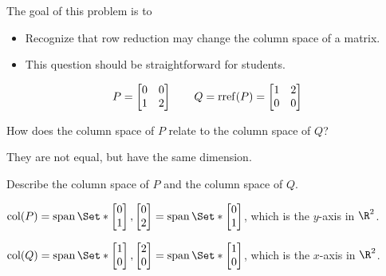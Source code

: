 \documentclass{problemset}
\newcommand{\bookonlynewpage}{\begin{bookonly}\newpage\end{bookonly}}
\begin{document}
	\bookonlynewpage
	\question
	\begin{annotation}
		\begin{goals}

			The goal of this problem is to
			\begin{itemize}
				\item Recognize that row reduction may change the column space of a matrix.
			\end{itemize}
		\end{goals}

		\begin{notes}
			\begin{itemize}
				\item This question should be straightforward for students.
			\end{itemize}
		\end{notes}
	\end{annotation}
	\[
		P=\mat{0&0\\1&2}\qquad Q=\rref(P)=\mat{1&2\\0&0}
	\]
	\begin{parts}
		\item How does the column space of $P$ relate to the column space of $Q$?
			\begin{solution}
				They are not equal, but have the same dimension.
			\end{solution}
		\item Describe the column space of $P$ and the column space of $Q$.
			\begin{solution}
				$\Col(P)=\Span\Set*{\mat{0\\1},\mat{0\\2}}=\Span\Set*{\mat{0\\1}}$,
				which is the $y$-axis in $\R^2$.

				$\Col(Q)=\Span\Set*{\mat{1\\0},\mat{2\\0}}=\Span\Set*{\mat{1\\0}}$,
				which is the $x$-axis in $\R^2$.
			\end{solution}
	\end{parts}
\end{document}
